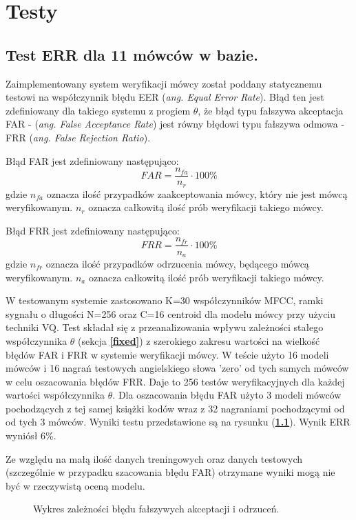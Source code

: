 \chapter{Testy}

\section{Test ERR dla 11 mówców w bazie.}

Zaimplementowany system weryfikacji mówcy został poddany statycznemu testowi na współczynnik błędu EER (\textit{ang. Equal Error Rate}). Błąd ten jest zdefiniowany dla takiego systemu z progiem $\theta$, że błąd typu fałszywa akceptacja FAR - (\textit{ang. False Acceptance Rate}) jest równy błędowi typu fałszywa odmowa - FRR (\textit{ang. False Rejection Ratio}).

Błąd FAR jest zdefiniowany następująco:
  \begin{equation}
  FAR = \frac{n_{fa}}{n_r} \cdot 100\%
  \end{equation}
  gdzie $n_{fa}$ oznacza ilość przypadków zaakceptowania mówcy, który nie jest mówcą weryfikowanym. $n_{r}$ oznacza całkowitą ilość prób weryfikacji takiego mówcy.

Błąd FRR jest zdefiniowany następująco:
  \begin{equation}
  FRR = \frac{n_{fr}}{n_a} \cdot 100\%
  \end{equation}
  gdzie $n_{fr}$ oznacza ilość przypadków odrzucenia mówcy, będącego mówcą weryfikowanym. $n_{a}$ oznacza całkowitą ilość prób weryfikacji takiego mówcy.


W testowanym systemie zastosowano K=30 współczynników MFCC, ramki sygnału o długości N=256 oraz C=16 centroid dla modelu mówcy przy użyciu techniki VQ. Test składał się z przeanalizowania wpływu zależności stałego współczynnika $\theta$ (sekcja \textbf{\ref{fixed}}) z szerokiego zakresu wartości na wielkość błędów FAR i FRR w systemie weryfikacji mówcy. W teście użyto 16 modeli mówców i 16 nagrań testowych angielskiego słowa 'zero' od tych samych mówców w celu oszacowania błędów FRR. Daje to 256 testów weryfikacyjnych dla każdej wartości współczynnika $\theta$. Dla oszacowania błędu FAR użyto 3 modeli mówców pochodzących z tej samej książki kodów wraz z 32 nagraniami pochodzącymi od od tych 3 mówców. Wyniki testu przedstawione są na rysunku (\textbf{\ref{fig:err}}). Wynik ERR wyniósł 6\%.

Ze względu na małą ilość danych treningowych oraz danych testowych (szczególnie w przypadku szacowania błędu FAR) otrzymane wyniki mogą nie być w rzeczywistą oceną modelu. 


\begin{figure}[t]
  \centering
    
    \caption{\label{fig:err} Wykres zależności błędu fałszywych akceptacji i odrzuceń.}
\end{figure}
